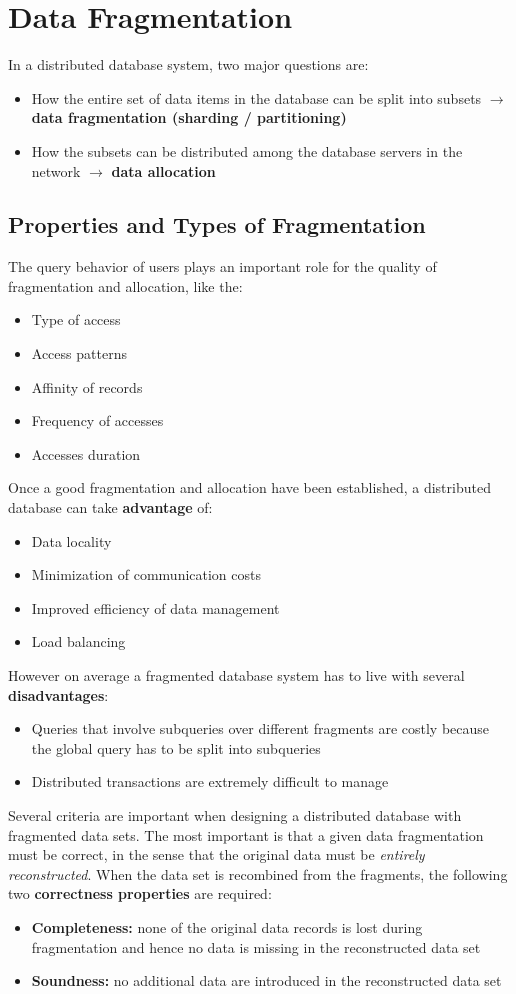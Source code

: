 \chapter{Data Fragmentation}
In a distributed database system, two major questions are:
\begin{itemize}
    \item How the entire set of data items in the database can be split into subsets \(\rightarrow\) \textbf{ data fragmentation (sharding / partitioning)}
    \item How the subsets can be distributed among the database servers in the network \(\rightarrow\) \textbf{data allocation}
\end{itemize}

\section{Properties and Types of Fragmentation}
The query behavior of users plays an important role for the quality of fragmentation and allocation, like the:
\begin{itemize}
    \item Type of access
    \item Access patterns
    \item Affinity of records
    \item Frequency of accesses 
    \item Accesses duration
\end{itemize}
Once a good fragmentation and allocation have been established, a distributed database can take \textbf{advantage} of:
\begin{itemize}
    \item Data locality
    \item Minimization of communication costs
    \item Improved efficiency of data management
    \item Load balancing 
\end{itemize}
However on average a fragmented database system has to live with several \textbf{disadvantages}:
\begin{itemize}
    \item Queries that involve subqueries over different fragments are costly because the global query has to be split into subqueries
    \item Distributed transactions are extremely difficult to manage
\end{itemize}
Several criteria are important when designing a distributed database with fragmented data sets. The most important is that a given data fragmentation must be correct, in the sense that the original data must be \textit{entirely reconstructed}. When the data set is recombined from the fragments, the following two \textbf{correctness properties} are required:
\begin{itemize}
    \item \textbf{Completeness:} none of the original data records is lost during fragmentation and hence no data is missing in the reconstructed data set
    \item \textbf{Soundness:} no additional data are introduced in the reconstructed data set
\end{itemize}


